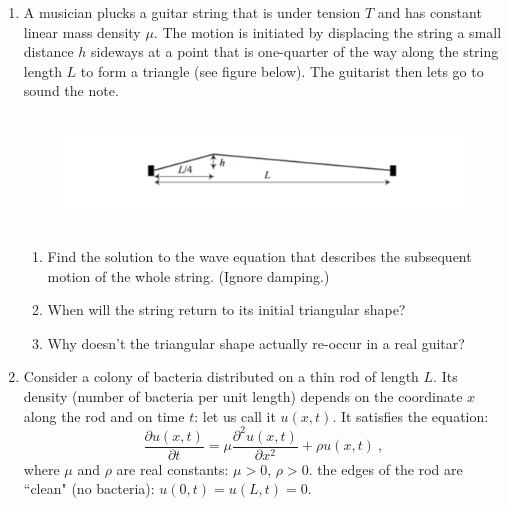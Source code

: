 \documentclass[fleqn]{article}
\begin{document}
  \begin{enumerate}

    \item A musician plucks a guitar string that is under tension $T$ and has constant linear mass density $\mu$. The motion is initiated by displacing the string a small distance $h$ sideways at a point that is one-quarter of the way along the string length $L$ to form a triangle (see figure below). The guitarist then lets go to sound the note. \\
    
      \begin{figure}[htbp]
        \begin{center}
          \includegraphics[height=3cm, width=15cm]{guitar.PNG}
        \label{default}
        \end{center}
      \end{figure}
    
      \begin{enumerate}
      \item Find the solution to the wave equation that describes the subsequent motion of the whole string. (Ignore damping.)
      \item When will the string return to its initial triangular shape?
      \item Why doesn't the triangular shape actually re-occur in a real guitar?
      \end{enumerate}
     
    
    \item  Consider a colony of bacteria distributed on a thin rod of length $L$. Its density (number of bacteria per unit length) depends on the coordinate $x$ along the rod and on time $t$: let us call it $u(x,t)$.  It satisfies the equation:
      \begin{equation}
    \frac{\partial u(x,t)}{\partial t} = \mu \frac{\partial^2 u(x,t)}{\partial x^2}+ \rho  u(x,t)~,
      \end{equation}
      where $\mu$ and $\rho$ are real constants: $\mu>0$, $\rho>0$.  the edges of the rod are ``clean" (no bacteria): $u(0,t)=u(L,t)=0$.
     \begin{enumerate}
    

\end{enumerate}
\end{enumerate}
\end{document}
